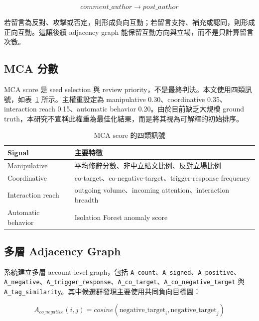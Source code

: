 \documentclass[conference]{IEEEtran}
\begin{document}
\begin{equation}
comment\_author \rightarrow post\_author
\end{equation}

若留言為反對、攻擊或否定，則形成負向互動；若留言支持、補充或認同，則形成正向互動。這讓後續 adjacency graph 能保留互動方向與立場，而不是只計算留言次數。

\subsection{MCA 分數}

MCA score 是 seed selection 與 review priority，不是最終判決。本文使用四類訊號，如表~\ref{tab:mca-signals} 所示。主權重設定為 manipulative 0.30、coordinative 0.35、interaction reach 0.15、automatic behavior 0.20。由於目前缺乏大規模 ground truth，本研究不宣稱此權重為最佳化結果，而是將其視為可解釋的初始排序。

\begin{table}[htbp]
\centering
\caption{MCA score 的四類訊號}
\label{tab:mca-signals}
\small
\begin{tabular}{p{}p{}}
\toprule
Signal & 主要特徵 \\
\midrule
Manipulative & 平均修辭分數、非中立貼文比例、反對立場比例 \\
Coordinative & co-target、co-negative-target、trigger-response frequency \\
Interaction reach & outgoing volume、incoming attention、interaction breadth \\
Automatic behavior & Isolation Forest anomaly score \\
\bottomrule
\end{tabular}
\end{table}

\subsection{多層 Adjacency Graph}

系統建立多層 account-level graph，包括 \texttt{A\_count}、\texttt{A\_signed}、\texttt{A\_positive}、\texttt{A\_negative}、\texttt{A\_trigger\_response}、\texttt{A\_co\_target}、\texttt{A\_co\_negative\_target} 與 \texttt{A\_tag\_similarity}。其中候選群發現主要使用共同負向目標圖：

\begin{equation}
A_{co\_negative}(i,j)=cosine(\mathrm{negative\_target}_i, \mathrm{negative\_target}_j)
\end{equation}
\end{document}
